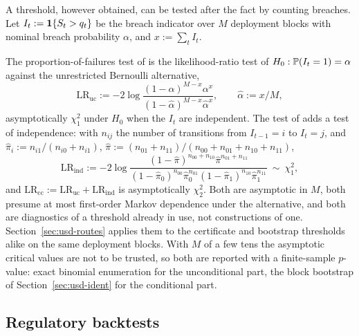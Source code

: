 \documentclass[../../../main.tex]{subfiles}
\begin{document}
A threshold, however obtained, can be tested after the fact by counting breaches. Let $I_t:=\mathbf{1}\{S_t>q_t\}$ be the breach indicator over $M$ deployment blocks with nominal breach probability $\alpha$, and $x:=\sum_tI_t$.

The proportion-of-failures test of \citet{kupiec1995} is the likelihood-ratio test of $H_0:\mathbb{P}(I_t=1)=\alpha$ against the unrestricted Bernoulli alternative,
\[
\mathrm{LR}_{\mathrm{uc}}:=-2\log\frac{(1-\alpha)^{M-x}\alpha^{x}}{(1-\hat\alpha)^{M-x}\hat\alpha^{x}},\qquad\hat\alpha:=x/M ,
\]
asymptotically $\chi^2_1$ under $H_0$ when the $I_t$ are independent. The test of \citet{christoffersen1998} adds a test of independence: with $n_{ij}$ the number of transitions from $I_{t-1}=i$ to $I_t=j$, and $\hat\pi_i:=n_{i1}/(n_{i0}+n_{i1})$, $\hat\pi:=(n_{01}+n_{11})/(n_{00}+n_{01}+n_{10}+n_{11})$,
\[
\mathrm{LR}_{\mathrm{ind}}:=-2\log\frac{(1-\hat\pi)^{n_{00}+n_{10}}\hat\pi^{n_{01}+n_{11}}}{(1-\hat\pi_0)^{n_{00}}\hat\pi_0^{n_{01}}(1-\hat\pi_1)^{n_{10}}\hat\pi_1^{n_{11}}}\ \sim\ \chi^2_1 ,
\]
and $\mathrm{LR}_{\mathrm{cc}}:=\mathrm{LR}_{\mathrm{uc}}+\mathrm{LR}_{\mathrm{ind}}$ is asymptotically $\chi^2_2$. Both are asymptotic in $M$, both presume at most first-order Markov dependence under the alternative, and both are diagnostics of a threshold already in use, not constructions of one. Section~\ref{sec:usd-routes} applies them to the certificate and bootstrap thresholds alike on the same deployment blocks. With $M$ of a few tens the asymptotic critical values are not to be trusted, so both are reported with a finite-sample $p$-value: exact binomial enumeration for the unconditional part, the block bootstrap of Section~\ref{sec:usd-ident} for the conditional part.


\subsection{Regulatory backtests}
\end{document}
